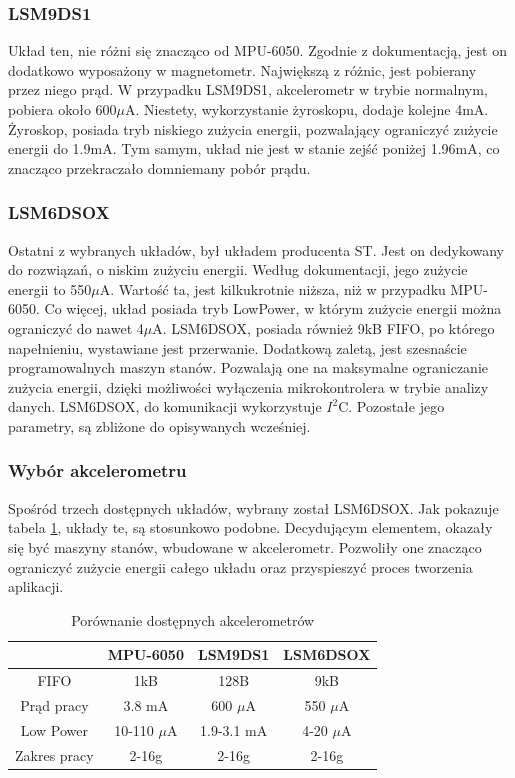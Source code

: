 \subsubsection{LSM9DS1}
Układ ten, nie różni się znacząco od MPU-6050. Zgodnie z dokumentacją, jest on dodatkowo wyposażony w magnetometr. Największą z różnic, jest pobierany przez niego prąd. W przypadku LSM9DS1, akcelerometr w trybie normalnym, pobiera około 600$\mu$A.\cite{LSM9DS1} Niestety, wykorzystanie żyroskopu, dodaje kolejne 4mA. Żyroskop, posiada tryb niskiego zużycia energii, pozwalający ograniczyć zużycie energii do 1.9mA. Tym samym, układ nie jest w stanie zejść poniżej 1.96mA, co znacząco przekraczało domniemany pobór prądu.

\subsubsection{LSM6DSOX}
Ostatni z wybranych układów, był układem producenta ST. Jest on dedykowany do rozwiązań, o niskim zużyciu energii. Według dokumentacji, jego zużycie energii to 550$\mu$A.\cite{LSM6DSOX} Wartość ta, jest kilkukrotnie niższa, niż w przypadku MPU-6050. Co więcej, układ posiada tryb LowPower, w którym zużycie energii można ograniczyć do nawet 4$\mu$A. LSM6DSOX, posiada również 9kB FIFO, po którego napełnieniu, wystawiane jest przerwanie. Dodatkową zaletą, jest szesnaście programowalnych maszyn stanów. Pozwalają one na maksymalne ograniczanie zużycia energii, dzięki możliwości wyłączenia mikrokontrolera w trybie analizy danych. LSM6DSOX, do komunikacji wykorzystuje $I^{2}$C. Pozostałe jego parametry, są zbliżone do opisywanych wcześniej.

\subsubsection{Wybór akcelerometru}
Spośród trzech dostępnych układów, wybrany został LSM6DSOX. Jak pokazuje tabela \ref{tab:accelerometer}, układy te, są stosunkowo podobne. Decydującym elementem, okazały się być maszyny stanów, wbudowane w akcelerometr. Pozwoliły one znacząco ograniczyć zużycie energii całego układu oraz przyspieszyć proces tworzenia aplikacji.

\begin{table}[h]
\centering
\begin{tabular}{|c | c | c | c|}
    \hline
     & MPU-6050 & LSM9DS1 & LSM6DSOX \\
    \hline
    FIFO & 1kB  &   128B  & 9kB \\
    \hline
    Prąd pracy  & 3.8 mA & 600 $\mu$A & 550 $\mu$A \\
    \hline
    Low Power & 10-110 $\mu$A & 1.9-3.1 mA & 4-20 $\mu$A\\
    \hline
    Zakres pracy & 2-16g & 2-16g & 2-16g\\
    \hline
\end{tabular}
\caption{Porównanie dostępnych akcelerometrów}
\label{tab:accelerometer}
\end{table}

